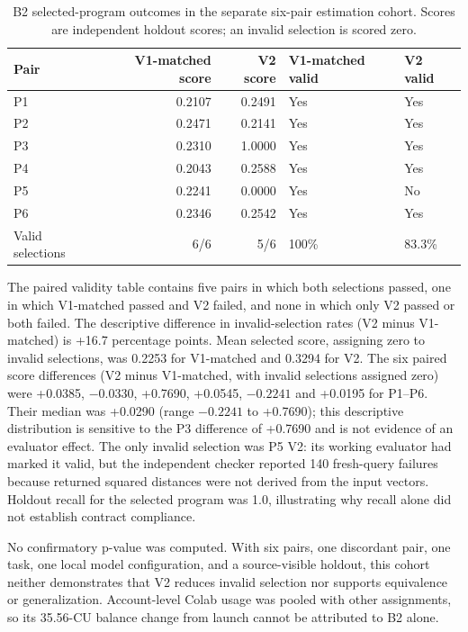 \documentclass[11pt]{article}
\begin{document}
\begin{table}[H]
\centering\small
\caption{B2 selected-program outcomes in the separate six-pair estimation cohort. Scores are independent holdout scores; an invalid selection is scored zero.}
\label{tab:b2}
\begin{tabularx}{\linewidth}{@{}lrrll@{}}
\toprule
Pair & V1-matched score & V2 score & V1-matched valid & V2 valid \\
\midrule
P1 & 0.2107 & 0.2491 & Yes & Yes \\
P2 & 0.2471 & 0.2141 & Yes & Yes \\
P3 & 0.2310 & 1.0000 & Yes & Yes \\
P4 & 0.2043 & 0.2588 & Yes & Yes \\
P5 & 0.2241 & 0.0000 & Yes & No \\
P6 & 0.2346 & 0.2542 & Yes & Yes \\
\midrule
Valid selections & 6/6 & 5/6 & 100\% & 83.3\% \\
\bottomrule
\end{tabularx}
\end{table}

The paired validity table contains five pairs in which both selections passed, one in which V1-matched passed and V2 failed, and none in which only V2 passed or both failed. The descriptive difference in invalid-selection rates (V2 minus V1-matched) is +16.7 percentage points. Mean selected score, assigning zero to invalid selections, was 0.2253 for V1-matched and 0.3294 for V2. The six paired score differences (V2 minus V1-matched, with invalid selections assigned zero) were +0.0385, $-0.0330$, +0.7690, +0.0545, $-0.2241$ and +0.0195 for P1--P6. Their median was +0.0290 (range $-0.2241$ to +0.7690); this descriptive distribution is sensitive to the P3 difference of +0.7690 and is not evidence of an evaluator effect. The only invalid selection was P5 V2: its working evaluator had marked it valid, but the independent checker reported 140 fresh-query failures because returned squared distances were not derived from the input vectors. Holdout recall for the selected program was 1.0, illustrating why recall alone did not establish contract compliance.

No confirmatory p-value was computed. With six pairs, one discordant pair, one task, one local model configuration, and a source-visible holdout, this cohort neither demonstrates that V2 reduces invalid selection nor supports equivalence or generalization. Account-level Colab usage was pooled with other assignments, so its 35.56-CU balance change from launch cannot be attributed to B2 alone.
\end{document}
